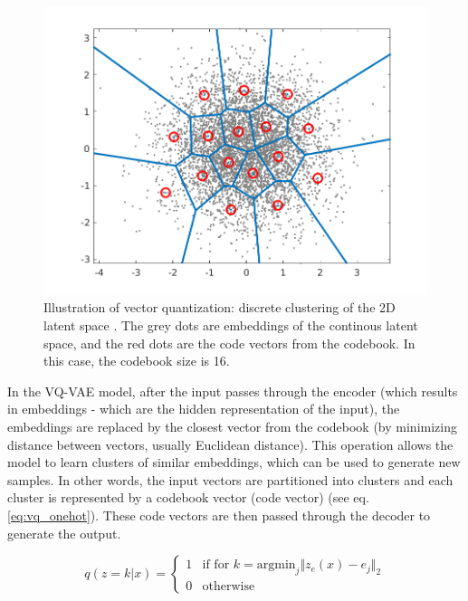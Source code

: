 \begin{figure}[h]
    \centering
    \includegraphics[scale=0.5]{images/vq_visualization.png}
    \caption{Illustration of vector quantization: discrete clustering of the 2D latent space \cite{vq_visualization_website}. The grey dots are embeddings of the continous latent space, and the red dots are the code vectors from the codebook. In this case, the codebook size is 16.}
    \label{figure:vq_visualization}
\end{figure}

In the VQ-VAE model, after the input passes through the encoder (which results in embeddings - which are the hidden representation of the input), the embeddings are replaced by the closest vector from the codebook (by minimizing distance between vectors, usually Euclidean distance). This operation allows the model to learn clusters of similar embeddings, which can be used to generate new samples. In other words, the input vectors are partitioned into clusters and each cluster is represented by a codebook vector (code vector) (see eq. \ref{eq:vq_onehot}). These code vectors are then passed through the decoder to generate the output.

\begin{equation}
    \label{eq:vq_onehot}
    q(z=k|x) = \begin{cases}
        1 & \text{if } \text{for } k=\text{argmin}_j \Vert z_e(x) - e_j \Vert_2 \\
        0 & \text{otherwise}
    \end{cases}
\end{equation}

